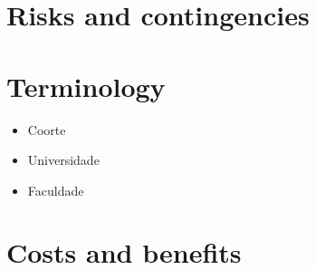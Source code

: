 \documentclass{report}
\begin{document}
\chapter{Risks and contingencies}

\chapter{Terminology}

\begin{itemize}
\item Coorte
\item Universidade
\item Faculdade
\end{itemize}

\chapter{Costs and benefits}



\end{document}
